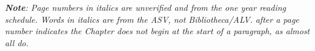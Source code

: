 \documentclass{article}
\newlength{\minipageheight}
\newlength{\minipagewidth}
\begin{document}
\begin{minipage}[r][\minipageheight][t]{\minipagewidth}
    \vspace{1.2in}%
    \textit{
        \textbf{Note}:
        Page numbers in italics are unverified and from the one year reading schedule.
        Words in italics are from the ASV, not Bibliotheca/ALV.}
     \textit{after a page number indicates the Chapter does not begin at the start of a paragraph, as almost all do.}%
\end{minipage}%
%




%
%
\end{document}
